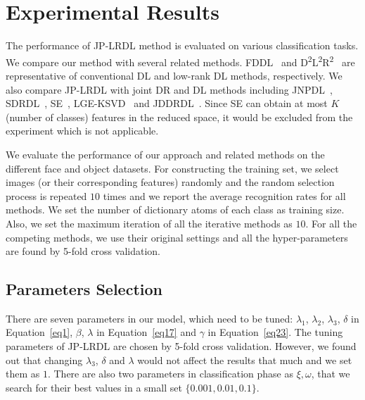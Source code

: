 \documentclass[journal]{IEEEtran}
\begin{document}
\section{Experimental Results}
\label{sec:experiment}
The performance of JP-LRDL method is evaluated on various classification tasks. We compare our method with several related methods. FDDL~\cite{FDDL} and D\textsuperscript{2}L\textsuperscript{2}R\textsuperscript{2}~\cite{D2L2R2} are representative of conventional DL and low-rank DL methods, respectively. We also compare JP-LRDL with joint DR and DL methods including JNPDL~\cite{JNPDL}, SDRDL~\cite{Simul-DL}, SE~\cite{SE}, LGE-KSVD~\cite{LGE-KSVD} and JDDRDL~\cite{JDDRDL}. Since SE can obtain at most $K$ (number of classes) features in the reduced space, it would be excluded from the experiment which is not applicable.

We evaluate the performance of our approach and related methods on the different face and object datasets. For constructing the training set, we select images (or their corresponding features) randomly and the random selection process is repeated $10$ times and we report the average recognition rates for all methods. We set the number of dictionary atoms of each class as training size. Also, we set the maximum iteration of all the iterative methods as $10$. For all the competing methods, we use their original settings and all the hyper-parameters are found by 5-fold cross validation.
\subsection{Parameters Selection}
There are seven parameters in our model, which need to be tuned: $\lambda_1$, $\lambda_2$, $\lambda_3$, $\delta$ in Equation~\eqref{eq1}, $\beta$, $\lambda$ in Equation~\eqref{eq17} and $\gamma$ in Equation~\eqref{eq23}. The tuning parameters of JP-LRDL are chosen by 5-fold cross validation. However, we found out that changing $\lambda_3$, $\delta$ and $\lambda$ would not affect the results that much and we set them as $1$. There are also two parameters in classification phase as $\xi, \omega$, that we search for their best values in a small set $\{0.001, 0.01,0.1\}$. 
\end{document}
